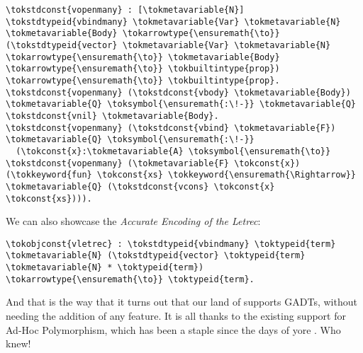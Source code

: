 \begin{verbatim}
\tokstdconst{vopenmany} : [\tokmetavariable{N}] \tokstdtypeid{vbindmany} \tokmetavariable{Var} \tokmetavariable{N} \tokmetavariable{Body} \tokarrowtype{\ensuremath{\to}} (\tokstdtypeid{vector} \tokmetavariable{Var} \tokmetavariable{N} \tokarrowtype{\ensuremath{\to}} \tokmetavariable{Body} \tokarrowtype{\ensuremath{\to}} \tokbuiltintype{prop}) \tokarrowtype{\ensuremath{\to}} \tokbuiltintype{prop}.
\tokstdconst{vopenmany} (\tokstdconst{vbody} \tokmetavariable{Body}) \tokmetavariable{Q} \toksymbol{\ensuremath{:\!-}} \tokmetavariable{Q} \tokstdconst{vnil} \tokmetavariable{Body}.
\tokstdconst{vopenmany} (\tokstdconst{vbind} \tokmetavariable{F}) \tokmetavariable{Q} \toksymbol{\ensuremath{:\!-}}
  (\tokconst{x}:\tokmetavariable{A} \toksymbol{\ensuremath{\to}} \tokstdconst{vopenmany} (\tokmetavariable{F} \tokconst{x}) (\tokkeyword{fun} \tokconst{xs} \tokkeyword{\ensuremath{\Rightarrow}} \tokmetavariable{Q} (\tokstdconst{vcons} \tokconst{x} \tokconst{xs}))).
\end{verbatim}

We can also showcase the \emph{Accurate Encoding of the Letrec}:

\importantCodeblock{}

\begin{verbatim}
\tokobjconst{vletrec} : \tokstdtypeid{vbindmany} \toktypeid{term} \tokmetavariable{N} (\tokstdtypeid{vector} \toktypeid{term} \tokmetavariable{N} * \toktypeid{term}) \tokarrowtype{\ensuremath{\to}} \toktypeid{term}.
\end{verbatim}

\importantCodeblockEnd{}

And that is the way that it turns out that our land of
\lamprolog supports GADTs, without needing the addition of any feature.
It is all thanks to the existing support for Ad-Hoc Polymorphism, which
has been a staple since the days of yore
\citep{lambdaprolog-early-reference}. Who knew!

\identDialog
